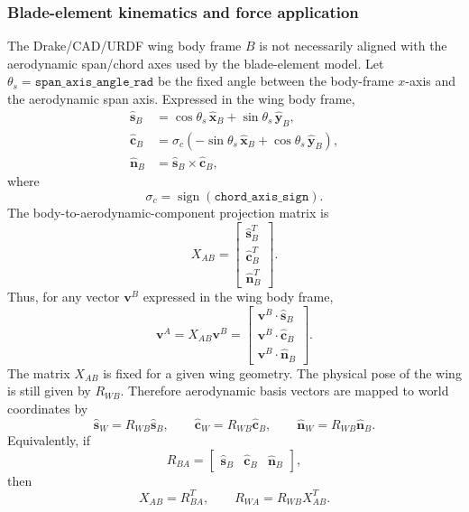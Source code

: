 \documentclass{article}
\begin{document}
\subsubsection{Blade-element kinematics and force application}

The Drake/CAD/URDF wing body frame \(B\) is not necessarily aligned with the
aerodynamic span/chord axes used by the blade-element model. Let
\(\theta_s=\texttt{span\_axis\_angle\_rad}\) be the fixed angle between the
body-frame \(x\)-axis and the aerodynamic span axis. Expressed in the wing body
frame,
\begin{align}
    \hat{\mathbf{s}}_B
        &= \cos\theta_s\,\hat{\mathbf{x}}_B
        + \sin\theta_s\,\hat{\mathbf{y}}_B, \\
    \hat{\mathbf{c}}_B
        &= \sigma_c
        \left(
            -\sin\theta_s\,\hat{\mathbf{x}}_B
            + \cos\theta_s\,\hat{\mathbf{y}}_B
        \right), \\
    \hat{\mathbf{n}}_B
        &= \hat{\mathbf{s}}_B \times \hat{\mathbf{c}}_B,
\end{align}
where
\[
    \sigma_c = \operatorname{sign}(\texttt{chord\_axis\_sign}).
\]
The body-to-aerodynamic-component projection matrix is
\begin{equation}
    X_{AB}
    =
    \begin{bmatrix}
        \hat{\mathbf{s}}_B^T\\
        \hat{\mathbf{c}}_B^T\\
        \hat{\mathbf{n}}_B^T
    \end{bmatrix}.
\end{equation}
Thus, for any vector \(\mathbf{v}^B\) expressed in the wing body frame,
\begin{equation}
    \mathbf{v}^A
    =
    X_{AB}\mathbf{v}^B
    =
    \begin{bmatrix}
        \mathbf{v}^B\cdot\hat{\mathbf{s}}_B\\
        \mathbf{v}^B\cdot\hat{\mathbf{c}}_B\\
        \mathbf{v}^B\cdot\hat{\mathbf{n}}_B
    \end{bmatrix}.
\end{equation}
The matrix \(X_{AB}\) is fixed for a given wing geometry. The physical pose of the
wing is still given by \(R_{WB}\). Therefore aerodynamic basis vectors are mapped
to world coordinates by
\begin{equation}
    \hat{\mathbf{s}}_W = R_{WB}\hat{\mathbf{s}}_B,
    \qquad
    \hat{\mathbf{c}}_W = R_{WB}\hat{\mathbf{c}}_B,
    \qquad
    \hat{\mathbf{n}}_W = R_{WB}\hat{\mathbf{n}}_B.
\end{equation}
Equivalently, if
\[
    R_{BA}
    =
    \begin{bmatrix}
        \hat{\mathbf{s}}_B &
        \hat{\mathbf{c}}_B &
        \hat{\mathbf{n}}_B
    \end{bmatrix},
\]
then
\begin{equation}
    X_{AB}=R_{BA}^T,
    \qquad
    R_{WA}=R_{WB}X_{AB}^T.
\end{equation}
\end{document}
